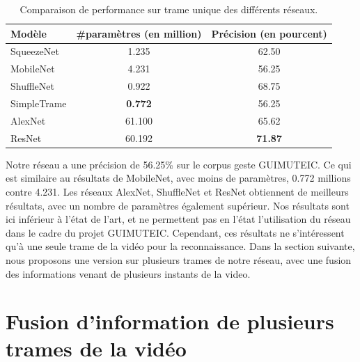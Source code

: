 \begin{table}
\centering
\begin{tabular}{|l|c|c|}
\hline
Modèle & \#paramètres (en million) & Précision (en pourcent) \\
\hline
\hline
SqueezeNet & 1.235 & 62.50  \\
\hline
MobileNet & 4.231 & 56.25  \\
\hline
ShuffleNet & 0.922 & 68.75  \\
\hline
SimpleTrame & \textbf{0.772} & 56.25  \\
\hline
AlexNet & 61.100 & 65.62 \\
\hline
ResNet & 60.192 & \textbf{71.87} \\
\hline
\end{tabular}
\caption{Comparaison de performance sur trame unique des différents réseaux.}
\label{tab:singleframe}
\end{table}

Notre réseau a une précision de 56.25\% sur le corpus geste GUIMUTEIC. 
Ce qui est similaire au résultats de MobileNet, avec moins de paramètres, 0.772 millions contre 4.231.
Les réseaux AlexNet, ShuffleNet et ResNet obtiennent de meilleurs résultats, avec un nombre de paramètres également supérieur.
Nos résultats sont ici inférieur à l'état de l'art, et ne permettent pas en l'état l'utilisation du réseau dans le cadre du projet GUIMUTEIC.
Cependant, ces résultats ne s'intéressent qu'à une seule trame de la vidéo pour la reconnaissance.
Dans la section suivante, nous proposons une version sur plusieurs trames de notre réseau, avec une fusion des informations venant de plusieurs instants de la video.



%
%
%
\section{Fusion d'information de plusieurs trames de la vidéo}
\label{sec:multiframe}

